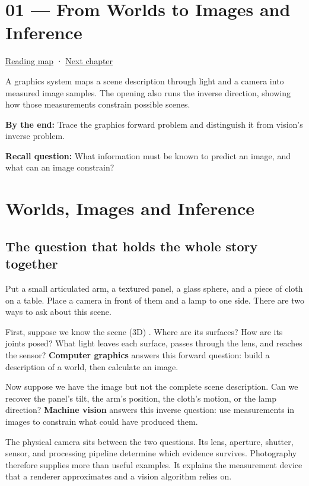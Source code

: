\hypertarget{03-visual-computing-i-ch001}{}
\section{01 --- From Worlds to Images and Inference}\label{from-worlds-to-images-and-inference}

\href{Chapter\%20Edition/02\%20-\%20Graphics\%20Vision\%20and\%20XR/00\%20-\%20Reading\%20Map}{Reading map} · \hyperref[03-visual-computing-i-ch002]{Next chapter}

A graphics system maps a scene description through light and a camera into measured image samples. The opening also runs the inverse direction, showing how those measurements constrain possible scenes.

\textbf{By the end:} Trace the graphics forward problem and distinguish it from vision's inverse problem.

\textbf{Recall question:} What information must be known to predict an image, and what can an image constrain?

\section{Worlds, Images and Inference}\label{worlds-images-and-inference}

\subsection{The question that holds the whole story together}\label{the-question-that-holds-the-whole-story-together}

Put a small articulated arm, a textured panel, a glass sphere, and a piece of cloth on a table. Place a camera in front of them and a lamp to one side. There are two ways to ask about this scene.

First, suppose we know the scene (3D) . Where are its surfaces? How are its joints posed? What light leaves each surface, passes through the lens, and reaches the sensor? \textbf{Computer graphics} answers this forward question: build a description of a world, then calculate an image.

Now suppose we have the image but not the complete scene description. Can we recover the panel's tilt, the arm's position, the cloth's motion, or the lamp direction? \textbf{Machine vision} answers this inverse question: use measurements in images to constrain what could have produced them.

The physical camera sits between the two questions. Its lens, aperture, shutter, sensor, and processing pipeline determine which evidence survives. Photography therefore supplies more than useful examples. It explains the measurement device that a renderer approximates and a vision algorithm relies on.

